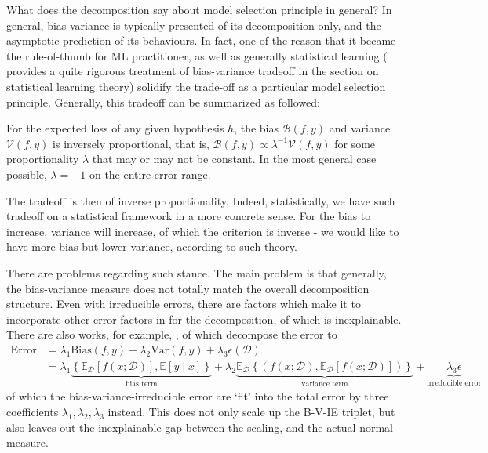 \documentclass[10pt]{article}
\begin{document}
What does the decomposition say about model selection principle in general? In general, bias-variance is typically presented of its decomposition only, and the asymptotic prediction of its behaviours. In fact, one of the reason that it became the rule-of-thumb for ML practitioner, as well as generally statistical learning (\cite{lafon_understanding_2024} provides a quite rigorous treatment of bias-variance tradeoff in the section on statistical learning theory) solidify the trade-off as a particular model selection principle. Generally, this tradeoff can be summarized as followed: 
\begin{theorem}
    For the expected loss of any given hypothesis $h$, the bias $\mathcal{B}(f,y)$ and variance $\mathcal{V}(f,y)$ is inversely proportional, that is, $\mathcal{B}(f,y)\propto \lambda^{-1} \mathcal{V}(f,y)$ for some proportionality $\lambda$ that may or may not be constant. In the most general case possible, $\lambda = -1$ on the entire error range. 
\end{theorem}

The tradeoff is then of inverse proportionality. Indeed, statistically, we have such tradeoff on a statistical framework in a more concrete sense. For the bias to increase, variance will increase, of which the criterion is inverse - we would like to have more bias but lower variance, according to such theory. 

There are problems regarding such stance. The main problem is that generally, the bias-variance measure does not totally match the overall decomposition structure. Even with irreducible errors, there are factors which make it to incorporate other error factors in for the decomposition, of which is inexplainable. There are also works, for example, \cite{domingos_unifeid_2000}, of which decompose the error to 
\begin{equation*}
        \begin{split}
            \mathrm{Error} & = \lambda_{1} \mathrm{Bias}(f,y) + \lambda_{2}\mathrm{Var}(f,y)+ \lambda_{3}\epsilon(\mathcal{D})\\ 
            & = \lambda_{1}\underbrace{\left\{ \mathbb{E}_{\mathcal{D}}[f(x;\mathcal{D})] , \mathbb{E}[y\mid x] \right\}}_{\text{bias term}} +\lambda_{2} \underbrace{\mathbb{E}_{\mathcal{D}} \left\{(f(x;\mathcal{D}), \mathbb{E}_{\mathcal{D}}[f(x;\mathcal{D})])\right\}}_{\text{variance term}} +\underbrace{\lambda_{3}\epsilon}_{\text{irreducible error}}
        \end{split}
\end{equation*}
of which the bias-variance-irreducible error are `fit' into the total error by three coefficients $\lambda_{1},\lambda_{2},\lambda_{3}$ instead. This does not only scale up the B-V-IE triplet, but also leaves out the inexplainable gap between the scaling, and the actual normal measure. 
\end{document}
